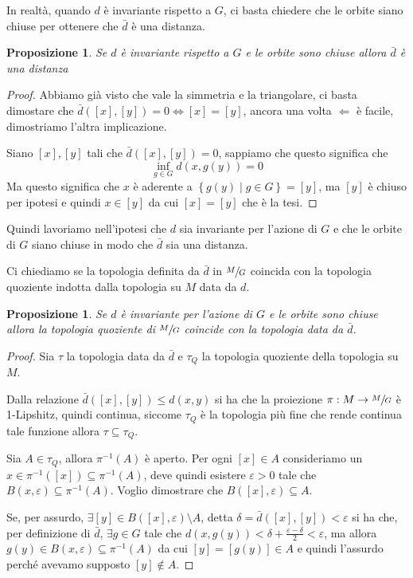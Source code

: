 \documentclass[a4paper,10pt]{article}
\newcounter{counter1}
\theoremstyle{plain}
\newtheorem{mypro}[counter1]{Proposizione}
\theoremstyle{definition}
\theoremstyle{remark}
\newcommand{\set}[1]{\left\{#1\right\}}
\newcommand{\bra}[1]{\left[#1\right]}
\begin{document}
In realtà, quando $d$ è invariante rispetto a $G$, ci basta chiedere
che le orbite siano chiuse per ottenere che $\bar d$ è una distanza.

\begin{mypro}
  Se $d$ è invariante rispetto a $G$ e le orbite sono chiuse allora
  $\bar d$ è una distanza
\end{mypro}
\begin{proof}
  Abbiamo già visto che vale la simmetria e la triangolare, ci basta
  dimostare che $\bar d (\bra{x},\bra{y}) = 0 \Leftrightarrow \bra{x}
  = \bra{y}$, ancora una volta $\Leftarrow$ è facile, dimostriamo
  l'altra implicazione.

  Siano $\bra{x}, \bra{y}$ tali che $\bar d ( \bra{x} , \bra{y}) = 0$,
  sappiamo che questo significa che
  \[ \inf _{g \in G} d(x,g(y)) = 0 \]
  Ma questo significa che $x$ è aderente a $\set{g(y)\mid g \in G} =
  \bra{y}$, ma $\bra{y}$ è chiuso per ipotesi e quindi $x \in \bra{y}$
  da cui $\bra{x} = \bra{y}$ che è la tesi.
\end{proof}

Quindi lavoriamo nell'ipotesi che $d$ sia invariante per l'azione di
$G$ e che le orbite di $G$ siano chiuse in modo che $\bar d$ sia una
distanza.

Ci chiediamo se la topologia definita da $\bar d$ in $\sfrac{M}{G}$
coincida con la topologia quoziente indotta dalla topologia su $M$
data da $d$.
\begin{mypro}
  Se $d$ è invariante per l'azione di $G$ e le orbite sono chiuse
  allora la topologia quoziente di $\sfrac{M}{G}$ coincide con la
  topologia data da $\bar d$.
\end{mypro}
\begin{proof}
  Sia $\tau$ la topologia data da $\bar d$ e $\tau _Q$ la topologia
  quoziente della topologia su $M$.

  Dalla relazione $\bar d ( \bra{x}, \bra{y} ) \le d(x,y)$ si ha che
  la proiezione $\pi : M \to \sfrac{M}{G}$ è 1-Lipshitz, quindi
  continua, siccome $\tau _Q$ è la topologia più fine che rende
  continua tale funzione allora $\tau \subseteq \tau _Q$.

  Sia $A \in \tau _Q$, allora $\pi ^{-1}(A)$ è aperto. Per ogni
  $\bra{x} \in A$ consideriamo un $x \in \pi^{-1}(\bra{x}) \subseteq
  \pi ^{-1}(A)$, deve quindi esistere $\varepsilon >0$ tale che
  $B(x,\varepsilon) \subseteq \pi ^{-1}(A)$. Voglio dimostrare che
  $B(\bra{x}, \varepsilon ) \subseteq A$.

  Se, per assurdo, $\exists \bra{y} \in B(\bra{x}, \varepsilon )
  \setminus A$, detta $\delta = \bar d (\bra{x}, \bra{y}) <
  \varepsilon$ si ha che, per definizione di $\bar d$, $\exists g \in
  G$ tale che $d(x,g(y)) < \delta + \frac{\varepsilon - \delta}{2} <
  \varepsilon$, ma allora $g(y) \in B(x,\varepsilon) \subseteq \pi
  ^{-1} (A)$ da cui $\bra{y} = \bra{g(y)} \in A$ e quindi l'assurdo
  perché avevamo supposto $\bra{y} \not\in A$.
\end{proof}
\end{document}

